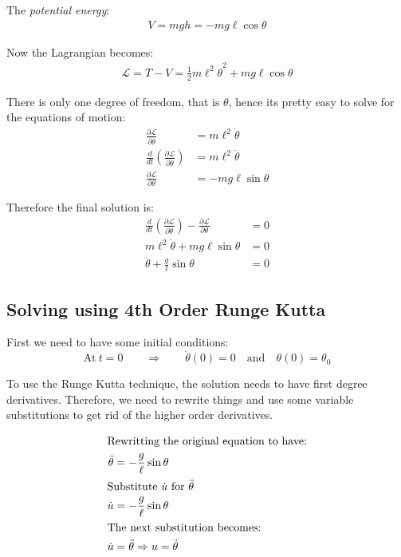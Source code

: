 \documentclass[letterpaper,8pt]{article}
\begin{document}
The \emph{potential energy}:
\begin{align*}
V = mgh = -mg \ell \cos \theta
\end{align*}

Now the Lagrangian becomes:
\begin{align*}
\mathcal{L} = T - V = \frac{1}{2} m \ell^2\dot{\theta}^2 + mg \ell \cos \theta
\end{align*}

There is only one degree of freedom, that is $\theta$, hence its pretty easy to solve for the equations of motion:
\begin{align*}
\frac{\partial \mathcal{L}}{\partial \dot{\theta}} &= m\ell^2 \dot{\theta} \\
\frac{d}{dt} \left( \frac{\partial \mathcal{L}}{\partial \dot{\theta}} \right) &= m\ell^2 \ddot{\theta}  \\
\frac{\partial \mathcal{L}}{\partial \theta} &= -mg \ell \sin \theta
\end{align*}

Therefore the final solution is:
\begin{align*}
\frac{d}{dt} \left( \frac{\partial \mathcal{L}}{\partial \dot{\theta}} \right) - \frac{\partial \mathcal{L}}{\partial \theta} &= 0 \\
m\ell^2 \ddot{\theta} + mg \ell \sin \theta &= 0 \\
\ddot{\theta} + \frac{g}{\ell} \sin \theta &= 0 
\end{align*}


\subsection{Solving using 4th Order Runge Kutta}

First we need to have some initial conditions:
\[
\text{At}\ t = 0 \qquad \Rightarrow \qquad \dot{\theta}(0) = 0 
\quad\text{and}\quad
\theta (0) = \theta_0
\]

To use the Runge Kutta technique, the solution needs to have first degree derivatives.  Therefore, we need to rewrite
things and use some variable substitutions to get rid of the higher order derivatives.

\begin{align*}
\intertext{Rewritting the original equation to have:}
\ddot{\theta} &= - \frac{g}{\ell} \sin \theta \\
\intertext{Substitute $\dot{u}$ for $\ddot{\theta}$}
\dot{u} &= -\frac{g}{\ell} \sin \theta \\
\intertext{The next substitution becomes:} 
\dot{u} &= \ddot{\theta} \Rightarrow u = \dot{\theta}
\end{align*}
\end{document}
